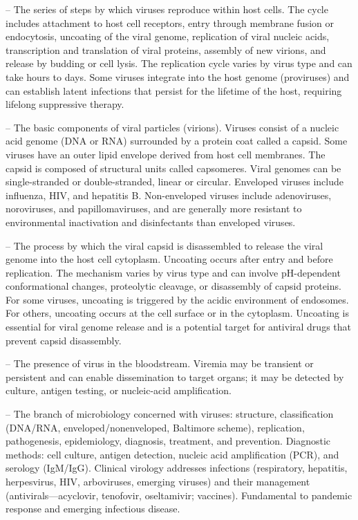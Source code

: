 -- The series of steps by which viruses reproduce within host cells. The cycle includes attachment to host cell receptors, entry through membrane fusion or endocytosis, uncoating of the viral genome, replication of viral nucleic acids, transcription and translation of viral proteins, assembly of new virions, and release by budding or cell lysis. The replication cycle varies by virus type and can take hours to days. Some viruses integrate into the host genome (proviruses) and can establish latent infections that persist for the lifetime of the host, requiring lifelong suppressive therapy.

-- The basic components of viral particles (virions). Viruses consist of a nucleic acid genome (DNA or RNA) surrounded by a protein coat called a capsid. Some viruses have an outer lipid envelope derived from host cell membranes. The capsid is composed of structural units called capsomeres. Viral genomes can be single-stranded or double-stranded, linear or circular. Enveloped viruses include influenza, HIV, and hepatitis B. Non-enveloped viruses include adenoviruses, noroviruses, and papillomaviruses, and are generally more resistant to environmental inactivation and disinfectants than enveloped viruses.

-- The process by which the viral capsid is disassembled to release the viral genome into the host cell cytoplasm. Uncoating occurs after entry and before replication. The mechanism varies by virus type and can involve pH-dependent conformational changes, proteolytic cleavage, or disassembly of capsid proteins. For some viruses, uncoating is triggered by the acidic environment of endosomes. For others, uncoating occurs at the cell surface or in the cytoplasm. Uncoating is essential for viral genome release and is a potential target for antiviral drugs that prevent capsid disassembly.

-- The presence of virus in the bloodstream. Viremia may be transient or persistent and can enable dissemination to target organs; it may be detected by culture, antigen testing, or nucleic-acid amplification.

-- The branch of microbiology concerned with viruses: structure, classification (DNA/RNA, enveloped/nonenveloped, Baltimore scheme), replication, pathogenesis, epidemiology, diagnosis, treatment, and prevention. Diagnostic methods: cell culture, antigen detection, nucleic acid amplification (PCR), and serology (IgM/IgG). Clinical virology addresses infections (respiratory, hepatitis, herpesvirus, HIV, arboviruses, emerging viruses) and their management (antivirals—acyclovir, tenofovir, oseltamivir; vaccines). Fundamental to pandemic response and emerging infectious disease.

